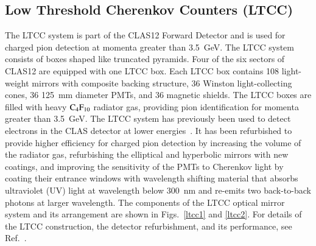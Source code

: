 \documentclass[final,3p,twocolumn]{elsarticle}
\begin{document}
\subsection{Low Threshold Cherenkov Counters (LTCC)}

The LTCC system is part of the CLAS12  Forward Detector and is used for charged pion detection at momenta
greater than 3.5~GeV. The LTCC system consists of boxes shaped like truncated pyramids. Four of the six sectors
of CLAS12 are equipped with one LTCC box. Each LTCC box contains 108 light-weight mirrors with composite
backing structure, 36 Winston light-collecting cones, 36 125~mm diameter PMTs, and 36 magnetic shields. The
LTCC boxes are filled with heavy $\rm C_4F_{10}$ radiator gas, providing pion identification for momenta greater
than 3.5~GeV. The LTCC system has previously been used to detect electrons in the CLAS detector at lower
energies~\cite{Adams:2001kk}. It has been refurbished to provide higher efficiency for charged pion detection
by increasing the volume of the radiator gas, refurbishing the elliptical and hyperbolic mirrors with new coatings, and
improving the sensitivity of the PMTs to Cherenkov light by coating their entrance windows with wavelength
shifting material that absorbs ultraviolet (UV) light at wavelength below 300~nm and re-emits two back-to-back
photons at larger wavelength. The components of the LTCC optical mirror system and its arrangement are shown in
Figs.~\ref{ltcc1} and \ref{ltcc2}.  For details of the LTCC construction, the detector refurbishment, and its
performance, see Ref.~\cite{LTCC}.   
\end{document}
